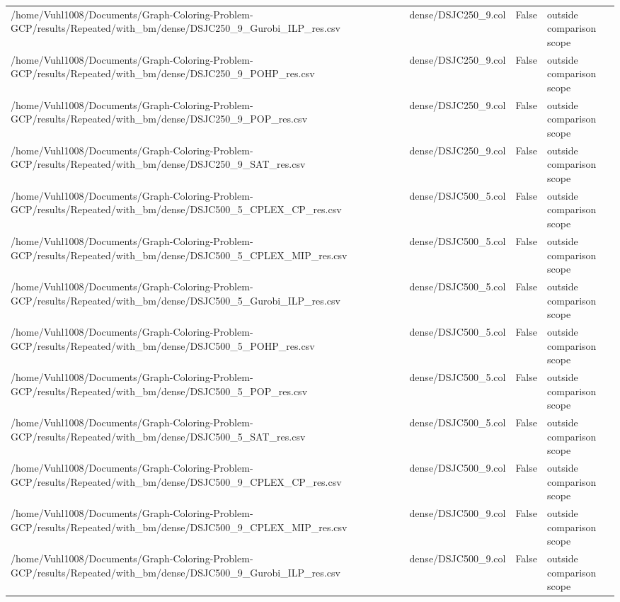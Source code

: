 \begin{table}[htbp]
\begin{tabular}{llll}
/home/Vuhl1008/Documents/Graph-Coloring-Problem-GCP/results/Repeated/with\_bm/dense/DSJC250\_9\_Gurobi\_ILP\_res.csv & dense/DSJC250\_9.col & False & outside comparison scope \\
/home/Vuhl1008/Documents/Graph-Coloring-Problem-GCP/results/Repeated/with\_bm/dense/DSJC250\_9\_POHP\_res.csv & dense/DSJC250\_9.col & False & outside comparison scope \\
/home/Vuhl1008/Documents/Graph-Coloring-Problem-GCP/results/Repeated/with\_bm/dense/DSJC250\_9\_POP\_res.csv & dense/DSJC250\_9.col & False & outside comparison scope \\
/home/Vuhl1008/Documents/Graph-Coloring-Problem-GCP/results/Repeated/with\_bm/dense/DSJC250\_9\_SAT\_res.csv & dense/DSJC250\_9.col & False & outside comparison scope \\
/home/Vuhl1008/Documents/Graph-Coloring-Problem-GCP/results/Repeated/with\_bm/dense/DSJC500\_5\_CPLEX\_CP\_res.csv & dense/DSJC500\_5.col & False & outside comparison scope \\
/home/Vuhl1008/Documents/Graph-Coloring-Problem-GCP/results/Repeated/with\_bm/dense/DSJC500\_5\_CPLEX\_MIP\_res.csv & dense/DSJC500\_5.col & False & outside comparison scope \\
/home/Vuhl1008/Documents/Graph-Coloring-Problem-GCP/results/Repeated/with\_bm/dense/DSJC500\_5\_Gurobi\_ILP\_res.csv & dense/DSJC500\_5.col & False & outside comparison scope \\
/home/Vuhl1008/Documents/Graph-Coloring-Problem-GCP/results/Repeated/with\_bm/dense/DSJC500\_5\_POHP\_res.csv & dense/DSJC500\_5.col & False & outside comparison scope \\
/home/Vuhl1008/Documents/Graph-Coloring-Problem-GCP/results/Repeated/with\_bm/dense/DSJC500\_5\_POP\_res.csv & dense/DSJC500\_5.col & False & outside comparison scope \\
/home/Vuhl1008/Documents/Graph-Coloring-Problem-GCP/results/Repeated/with\_bm/dense/DSJC500\_5\_SAT\_res.csv & dense/DSJC500\_5.col & False & outside comparison scope \\
/home/Vuhl1008/Documents/Graph-Coloring-Problem-GCP/results/Repeated/with\_bm/dense/DSJC500\_9\_CPLEX\_CP\_res.csv & dense/DSJC500\_9.col & False & outside comparison scope \\
/home/Vuhl1008/Documents/Graph-Coloring-Problem-GCP/results/Repeated/with\_bm/dense/DSJC500\_9\_CPLEX\_MIP\_res.csv & dense/DSJC500\_9.col & False & outside comparison scope \\
/home/Vuhl1008/Documents/Graph-Coloring-Problem-GCP/results/Repeated/with\_bm/dense/DSJC500\_9\_Gurobi\_ILP\_res.csv & dense/DSJC500\_9.col & False & outside comparison scope \\

\end{tabular}
\end{table}
